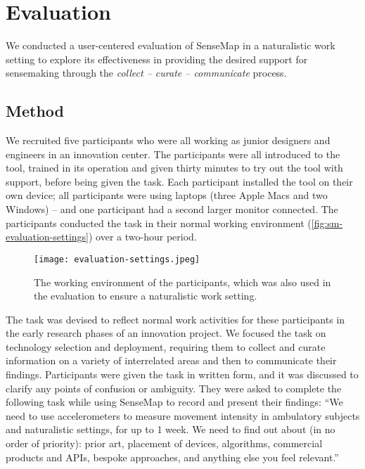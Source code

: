 \section{Evaluation}
We conducted a user-centered evaluation of SenseMap in a naturalistic work setting to explore its effectiveness in providing the desired support for sensemaking through the \emph{collect -- curate -- communicate} process. 

\subsection{Method}
We recruited five participants who were all working as junior designers and engineers in an innovation center. The participants were all introduced to the tool, trained in its operation and given thirty minutes to try out the tool with support, before being given the task. Each participant installed the tool on their own device; all participants were using laptops (three Apple Macs and two Windows) -- and one participant had a second larger monitor connected. The participants conducted the task in their normal working environment (\autoref{fig:sm-evaluation-settings}) over a two-hour period.

\begin{figure}
	\centering
	\texttt{[image: evaluation-settings.jpeg]}
	\caption[Naturalistic work setting in the evaluation]{The working environment of the participants, which was also used in the evaluation to ensure a naturalistic work setting.}
	\label{fig:sm-evaluation-settings}
\end{figure}

The task was devised to reflect normal work activities for these participants in the early research phases of an innovation project. We focused the task on technology selection and deployment, requiring them to collect and curate information on a variety of interrelated areas and then to communicate their findings. Participants were given the task in written form, and it was discussed to clarify any points of confusion or ambiguity. They were asked to complete the following task while using SenseMap to record and present their findings: ``We need to use accelerometers to measure movement intensity in ambulatory subjects and naturalistic settings, for up to 1 week. We need to find out about (in no order of priority): prior art, placement of devices, algorithms, commercial products and APIs, bespoke approaches, and anything else you feel relevant.''

